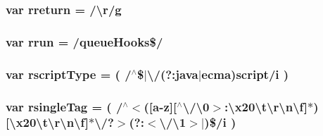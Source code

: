 \subsubsection[{\texorpdfstring{rreturn}{rreturn}}]{\setlength{\rightskip}{0pt plus 5cm}var rreturn = /\textbackslash{}r/g}\hypertarget{jquery-3_82_81_8js_a2b9eea29f18e1d3891628418507bd9bf}{}\label{jquery-3_82_81_8js_a2b9eea29f18e1d3891628418507bd9bf}
\subsubsection[{\texorpdfstring{rrun}{rrun}}]{\setlength{\rightskip}{0pt plus 5cm}var rrun = /queue\+Hooks\$/}\hypertarget{jquery-3_82_81_8js_acf9d5e6b315eca81eb432bb6ee280a2e}{}\label{jquery-3_82_81_8js_acf9d5e6b315eca81eb432bb6ee280a2e}
\subsubsection[{\texorpdfstring{rscript\+Type}{rscriptType}}]{\setlength{\rightskip}{0pt plus 5cm}var rscript\+Type = ( /$^\wedge$\$$\vert$\textbackslash{}/(?\+:java$\vert$ecma)script/i )}\hypertarget{jquery-3_82_81_8js_afe9e6e5fe3b5bee3de77fe4004b99f8c}{}\label{jquery-3_82_81_8js_afe9e6e5fe3b5bee3de77fe4004b99f8c}
\subsubsection[{\texorpdfstring{rsingle\+Tag}{rsingleTag}}]{\setlength{\rightskip}{0pt plus 5cm}var rsingle\+Tag = ( /$^\wedge$$<$(\mbox{[}a-\/z\mbox{]}\mbox{[}$^\wedge$\textbackslash{}/\textbackslash{}0$>$\+:\textbackslash{}x20\textbackslash{}t\textbackslash{}r\textbackslash{}n\textbackslash{}f\mbox{]}$\ast$)\mbox{[}\textbackslash{}x20\textbackslash{}t\textbackslash{}r\textbackslash{}n\textbackslash{}f\mbox{]}$\ast$\textbackslash{}/?$>$(?\+:$<$\textbackslash{}/\textbackslash{}1$>$$\vert$)\$/i )}\hypertarget{jquery-3_82_81_8js_aeb1fccd21efbe0d74148e2caa83de9bf}{}\label{jquery-3_82_81_8js_aeb1fccd21efbe0d74148e2caa83de9bf}
